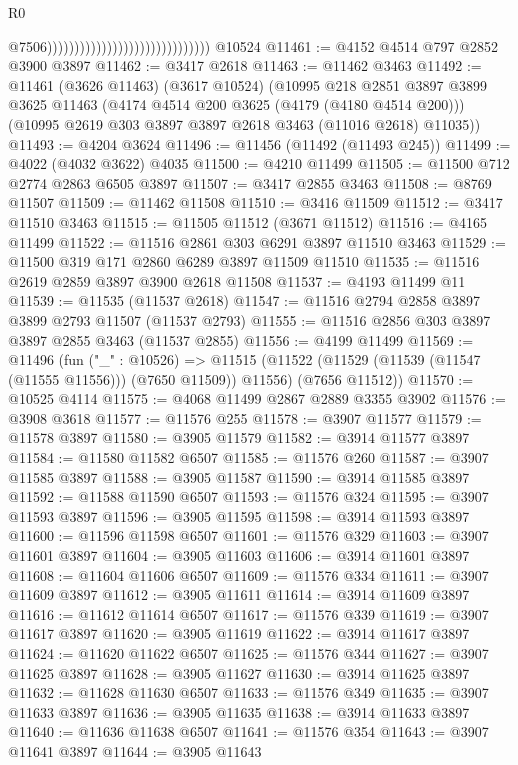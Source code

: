 \begin{lexlean}{R0}
\begin{coremodule}
                                                                @7506))))))))))))))))))))))))))))))
    @10524
@11461 := @4152 @4514 @797 @2852 @3900 @3897
@11462 := @3417 @2618
@11463 := @11462 @3463
@11492 := @11461
    (@3626 @11463)
    (@3617 @10524)
    (@10995
      @218
      @2851
      @3897
      @3899
      @3625
      @11463
      (@4174 @4514 @200 @3625 (@4179 (@4180 @4514 @200)))
      (@10995 @2619 @303 @3897 @3897 @2618 @3463 (@11016 @2618) @11035))
@11493 := @4204 @3624
@11496 := @11456 (@11492 (@11493 @245))
@11499 := @4022 (@4032 @3622) @4035
@11500 := @4210 @11499
@11505 := @11500 @712 @2774 @2863 @6505 @3897
@11507 := @3417 @2855 @3463
@11508 := @8769 @11507
@11509 := @11462 @11508
@11510 := @3416 @11509
@11512 := @3417 @11510 @3463
@11515 := @11505 @11512 (@3671 @11512)
@11516 := @4165 @11499
@11522 := @11516 @2861 @303 @6291 @3897 @11510 @3463
@11529 := @11500 @319 @171 @2860 @6289 @3897 @11509 @11510
@11535 := @11516 @2619 @2859 @3897 @3900 @2618 @11508
@11537 := @4193 @11499 @11
@11539 := @11535 (@11537 @2618)
@11547 := @11516 @2794 @2858 @3897 @3899 @2793 @11507 (@11537 @2793)
@11555 := @11516 @2856 @303 @3897 @3897 @2855 @3463 (@11537 @2855)
@11556 := @4199 @11499
@11569 := @11496
    (fun ("_" : @10526) =>
    @11515 (@11522 (@11529 (@11539 (@11547 (@11555 @11556))) (@7650 @11509)) @11556) (@7656 @11512))
@11570 := @10525 @4114
@11575 := @4068 @11499 @2867 @2889 @3355 @3902
@11576 := @3908 @3618
@11577 := @11576 @255
@11578 := @3907 @11577
@11579 := @11578 @3897
@11580 := @3905 @11579
@11582 := @3914 @11577 @3897
@11584 := @11580 @11582 @6507
@11585 := @11576 @260
@11587 := @3907 @11585 @3897
@11588 := @3905 @11587
@11590 := @3914 @11585 @3897
@11592 := @11588 @11590 @6507
@11593 := @11576 @324
@11595 := @3907 @11593 @3897
@11596 := @3905 @11595
@11598 := @3914 @11593 @3897
@11600 := @11596 @11598 @6507
@11601 := @11576 @329
@11603 := @3907 @11601 @3897
@11604 := @3905 @11603
@11606 := @3914 @11601 @3897
@11608 := @11604 @11606 @6507
@11609 := @11576 @334
@11611 := @3907 @11609 @3897
@11612 := @3905 @11611
@11614 := @3914 @11609 @3897
@11616 := @11612 @11614 @6507
@11617 := @11576 @339
@11619 := @3907 @11617 @3897
@11620 := @3905 @11619
@11622 := @3914 @11617 @3897
@11624 := @11620 @11622 @6507
@11625 := @11576 @344
@11627 := @3907 @11625 @3897
@11628 := @3905 @11627
@11630 := @3914 @11625 @3897
@11632 := @11628 @11630 @6507
@11633 := @11576 @349
@11635 := @3907 @11633 @3897
@11636 := @3905 @11635
@11638 := @3914 @11633 @3897
@11640 := @11636 @11638 @6507
@11641 := @11576 @354
@11643 := @3907 @11641 @3897
@11644 := @3905 @11643

\end{coremodule}
\end{lexlean}
